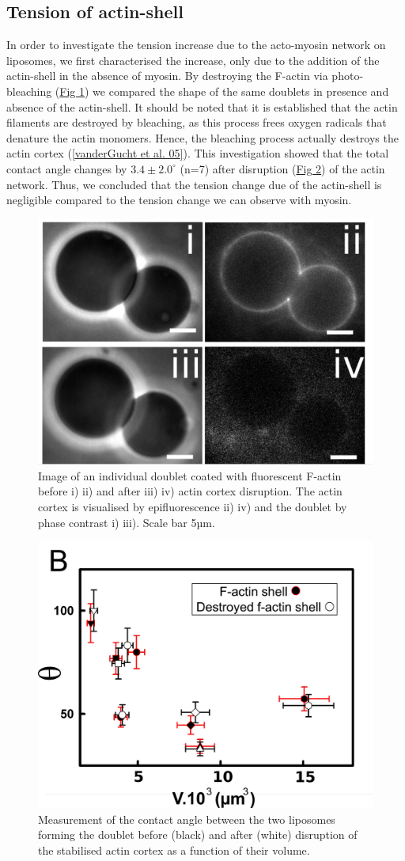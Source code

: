 \documentclass[A4paperpaper,11pt,english]{sphinxmanual}
\begin{document}
\subsection{Tension of actin-shell}
\label{parts/part4:tension-of-actin-shell}
In order to investigate the tension increase due to the acto-myosin network
on liposomes, we first characterised the increase, only due to the addition of the actin-shell in
the absence of myosin. By destroying the F-actin via photo-bleaching (\hyperref[parts/part4:fig2a]{Fig  \ref*{parts/part4:fig2a}}) we compared the shape of the
same doublets in presence and absence of the actin-shell. It should be noted that it is established that the
actin filaments are destroyed by bleaching, as this process frees oxygen radicals that denature the actin monomers. Hence, the bleaching process
actually destroys the actin cortex ({\hyperref[parts/part4:vandergucht2005]{{[}vanderGucht et al. 05{]}}}).
This investigation showed that the total contact
angle changes by \(3.4 \pm 2.0 ^{\circ}\) (n=7) after disruption (\hyperref[parts/part4:fig2b]{Fig  \ref*{parts/part4:fig2b}}) of the actin network.
Thus, we concluded that the tension change due of the actin-shell is negligible
compared to the tension change we can observe with myosin.
\begin{figure}[htbp]
\centering
\capstart

\includegraphics[width=0.500\linewidth]{Fig_02-A.png}
\caption{Image of an individual doublet coated with fluorescent F-actin before i) ii) and
after iii) iv) actin cortex disruption. The actin cortex is visualised by
epifluorescence ii) iv) and the doublet by phase contrast i) iii). Scale
bar 5µm.}\label{parts/part4:fig2a}\end{figure}
\begin{figure}[htbp]
\centering
\capstart

\includegraphics[width=0.500\linewidth]{Fig_02-B.png}
\caption{Measurement of the contact angle between the two liposomes forming the
doublet before (black) and after (white) disruption of the stabilised actin
cortex as a function of their volume.}\label{parts/part4:fig2b}\end{figure}
\end{document}
